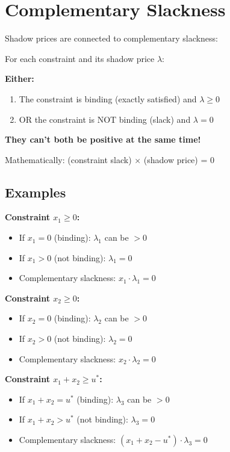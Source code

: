 \documentclass[11pt]{article}
\begin{document}
\section{Complementary Slackness}

Shadow prices are connected to complementary slackness:

\begin{tcolorbox}[colback=blue!5!white,colframe=blue!75!black,title=Complementary Slackness Rules]

For each constraint and its shadow price $\lambda$:

\textbf{Either:}
\begin{enumerate}
\item The constraint is binding (exactly satisfied) and $\lambda \geq 0$
\item OR the constraint is NOT binding (slack) and $\lambda = 0$
\end{enumerate}

\textbf{They can't both be positive at the same time!}

Mathematically: (constraint slack) $\times$ (shadow price) = 0

\end{tcolorbox}

\subsection{Examples}

\textbf{Constraint $x_1 \geq 0$:}
\begin{itemize}
\item If $x_1 = 0$ (binding): $\lambda_1$ can be $> 0$
\item If $x_1 > 0$ (not binding): $\lambda_1 = 0$
\item Complementary slackness: $x_1 \cdot \lambda_1 = 0$
\end{itemize}

\textbf{Constraint $x_2 \geq 0$:}
\begin{itemize}
\item If $x_2 = 0$ (binding): $\lambda_2$ can be $> 0$
\item If $x_2 > 0$ (not binding): $\lambda_2 = 0$
\item Complementary slackness: $x_2 \cdot \lambda_2 = 0$
\end{itemize}

\textbf{Constraint $x_1 + x_2 \geq u^*$:}
\begin{itemize}
\item If $x_1 + x_2 = u^*$ (binding): $\lambda_3$ can be $> 0$
\item If $x_1 + x_2 > u^*$ (not binding): $\lambda_3 = 0$
\item Complementary slackness: $(x_1 + x_2 - u^*) \cdot \lambda_3 = 0$
\end{itemize}
\end{document}
